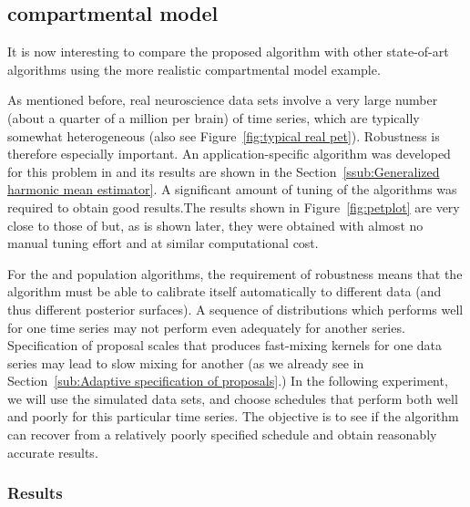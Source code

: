 \subsection{\protect\pet compartmental model}
\label{sub:pet compartmental model}

It is now interesting to compare the proposed algorithm with other
state-of-art algorithms using the more realistic \pet compartmental model
example.

As mentioned before, real neuroscience data sets involve a very large number
(about a quarter of a million per brain) of time series, which are typically
somewhat heterogeneous (also see Figure~\ref{fig:typical real pet}).
Robustness is therefore especially important. An application-specific \mcmc
algorithm was developed for this problem in \cite{Zhou2013} and its results
are shown in the Section~\ref{ssub:Generalized harmonic mean estimator}. A
significant amount of tuning of the algorithms was required to obtain good
results.The results shown in Figure~\ref{fig:petplot} are very close to those
of \cite{Zhou2013} but, as is shown later, they were obtained with almost no
manual tuning effort and at similar computational cost.

For the \smc and population \mcmc algorithms, the requirement of robustness
means that the algorithm must be able to calibrate itself automatically to
different data (and thus different posterior surfaces). A sequence of
distributions which performs well for one time series may not perform even
adequately for another series. Specification of proposal scales that produces
fast-mixing kernels for one data series may lead to slow mixing for another
(as we already see in Section~\ref{sub:Adaptive specification of proposals}.)
In the following experiment, we will use the simulated data sets, and choose
schedules that perform both well and poorly for this particular time series.
The objective is to see if the algorithm can recover from a relatively poorly
specified schedule and obtain reasonably accurate results.

\subsubsection{Results}

